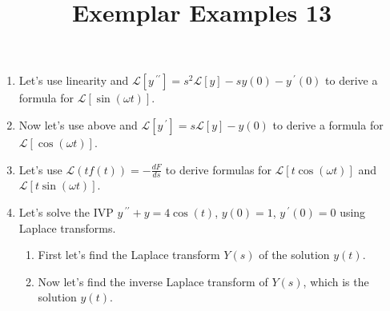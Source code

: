 \documentclass{ximera}
\begin{document}
\begin{abstract}
 \end{abstract}

    \title{Exemplar Examples 13}
    
    \maketitle

\begin{enumerate}

\item Let's use linearity and $\mathcal{L}[y\,^{\prime\prime}]=s^2\mathcal{L}[y]-sy(0)-y\,^{\prime}(0)$ to derive a formula for $\mathcal{L}[\sin{(\omega t)}]$. 


\vfill


 \item Now let's use above and $\mathcal{L}[y\,^{\prime}]=s\mathcal{L}[y]-y(0)$ to derive a formula for $\mathcal{L}[\cos{(\omega t)}]$.


\vfill

\newpage


\item Let's use $\displaystyle \mathcal{L}(tf(t))=-\frac{dF}{ds}$ to derive formulas for $\mathcal{L}[t\cos{(\omega t)}]$ and $\mathcal{L}[t\sin{(\omega t)}]$.



\newpage

\item Let's solve the IVP $y\,^{\prime\prime}+y=4\cos{(t)}$, $y(0)=1$, $y\,^{\prime}(0)=0$ using Laplace transforms.

\begin{enumerate}
\item First let's find the Laplace transform $Y(s)$ of the solution $y(t)$.

\vfill

\item  Now let's  find the inverse Laplace transform of $Y(s)$, which is the solution $y(t)$.


\vfill
\vfill











\end{enumerate}


\end{enumerate}
\end{document}
